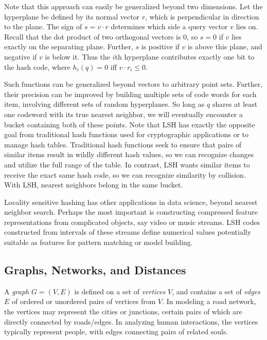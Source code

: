 \documentclass[10pt]{article}
\begin{document}
Note that this approach can easily be generalized beyond two dimensions. Let the hyperplane be defined by its normal vector $r$, which is perpendicular in direction to the plane. The sign of $s = v \cdot r$ determines which side a query vector $v$ lies on. Recall that the dot product of two orthogonal vectors is 0, so $s = 0$ if $v$ lies exactly on the separating plane. Further, $s$ is positive if $v$ is above this plane, and negative if $v$ is below it. Thus the $i$th hyperplane contributes exactly one bit to the hash code, where $h_{i}(q) = 0$ iff $v \cdot r_{i} \leq 0$.

Such functions can be generalized beyond vectors to arbitrary point sets. Further, their precision can be improved by building multiple sets of code words for each item, involving different sets of random hyperplanes. So long as $q$ shares at least one codeword with its true nearest neighbor, we will eventually encounter a bucket containing both of these points. Note that LSH has exactly the opposite goal from traditional hash functions used for cryptographic applications or to manage hash tables. Traditional hash functions seek to ensure that pairs of similar items result in wildly different hash values, so we can recognize changes and utilize the full range of the table. In contrast, LSH wants similar items to receive the exact same hash code, so we can recognize similarity by collision. With LSH, nearest neighbors belong in the same bucket.

Locality sensitive hashing has other applications in data science, beyond nearest neighbor search. Perhaps the most important is constructing compressed feature representations from complicated objects, say video or music streams. LSH codes constructed from intervals of these streams define numerical values potentially suitable as features for pattern matching or model building.

\subsection{Graphs, Networks, and Distances}
A \textit{graph} $G = (V, E)$ is defined on a set of \textit{vertices} $V$, and contains a set of \textit{edges} $E$ of ordered or unordered pairs of vertices from $V$. In modeling a road network, the vertices may represent the cities or junctions, certain pairs of which are directly connected by roads/edges. In analyzing human interactions, the vertices typically represent people, with edges connecting pairs of related souls.
\end{document}
